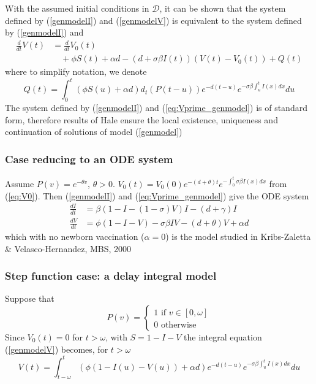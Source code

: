 \documentclass[aspectratio=43]{beamer}
\begin{document}
\begin{frame}\frametitle{}
With the assumed initial conditions in $\mathcal{D}$, it can be shown
that the system defined by (\ref{genmodelI}) and (\ref{genmodelV})
is equivalent to the system defined by (\ref{genmodelI}) and
\begin{align}
\frac{d}{dt}V(t) &= \frac{d}{dt}V_0(t) \label{eq:Vprime_genmodel}\\
&\quad +\phi S(t)+\alpha d-(d+\sigma\beta I(t))(V(t)-V_0(t)) 
+ Q(t)\nonumber
\end{align}
where to simplify notation, we denote
\[
Q(t)=\int_0^t (\phi S(u)+\alpha d) d_t(P(t-u))e^{-d(t-u)}
e^{-\sigma\beta\int_u^t I(x)dx}du
\]
\vfill
The system defined
by (\ref{genmodelI}) and (\ref{eq:Vprime_genmodel}) is 
of standard form, therefore results of
Hale ensure the local
existence, uniqueness and continuation of solutions of model
(\ref{genmodel})
\end{frame}

\begin{frame}\frametitle{Case reducing to an ODE system}
Assume $P(v)=e^{-\theta v}$, $\theta>0$. 
$V_0(t)=V_0(0)e^{-(d+\theta)t}e^{-\int_0^t\sigma\beta I(x)dx}$ from
(\ref{eq:V0}). Then (\ref{genmodelI}) and
(\ref{eq:Vprime_genmodel}) give the ODE system
\begin{subequations}\label{ODEmodel}
\begin{align}
\frac{dI}{dt} &= 
\beta(1-I-(1-\sigma)V)I-(d+\gamma)I
\label{ODEmodelI}\\
\frac{dV}{dt} &= 
\phi(1-I-V)-\sigma\beta IV -(d+\theta)V+\alpha d
\label{ODEmodelV}
\end{align}
\end{subequations}
which with no newborn vaccination ($\alpha=0$) is the model studied in
Kribs-Zaletta \& Velasco-Hernandez, MBS, 2000
\end{frame}



\begin{frame}\frametitle{Step function case: a delay integral model}
Suppose that
\[ 
P(v)=
\left\{
\begin{array}{l}
1\textrm{ if }v\in[0,\omega] \\
0\textrm{ otherwise} 
\end{array}
\right.
\]
Since $V_0(t)=0$ for $t>\omega$, with $S=1-I-V$ the
integral equation 
(\ref{genmodelV}) becomes, for $t>\omega$
\begin{equation}
  V(t)=\int_{t-\omega}^t(\phi (1-I(u)-V(u))+\alpha d)e^{-d(t-u)}
  e^{-\sigma\beta\int_u^tI(x)dx}du
  \label{eq:VoftStepCase}
\end{equation}
\end{frame}
\end{document}
